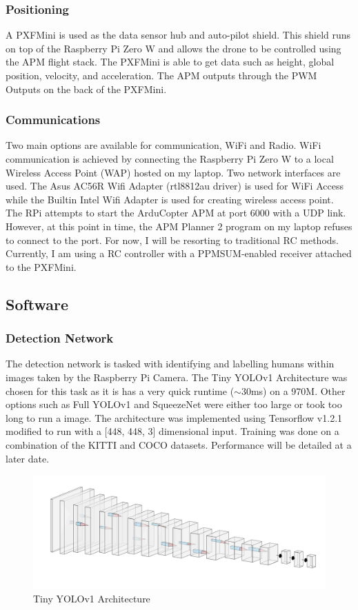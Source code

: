 \documentclass{article}
\begin{document}
\subsubsection{Positioning}
A PXFMini is used as the data sensor hub and auto-pilot shield. This shield runs on top of the Raspberry Pi Zero W and allows the drone to be controlled using the APM flight stack. The PXFMini is able to get data such as height, global position, velocity, and acceleration. The APM outputs through the PWM Outputs on the back of the PXFMini.

\subsubsection{Communications}
Two main options are available for communication, WiFi and Radio. WiFi communication is achieved by connecting the Raspberry Pi Zero W to a local Wireless Access Point (WAP) hosted on my laptop. Two network interfaces are used. The Asus AC56R Wifi Adapter (rtl8812au driver) is used for WiFi Access while the Builtin Intel Wifi Adapter is used for creating wireless access point. The RPi attempts to start the ArduCopter APM at port 6000 with a UDP link. However, at this point in time, the APM Planner 2 program on my laptop refuses to connect to the port. For now, I will be resorting to traditional RC methods. Currently, I am using a RC controller with a PPMSUM-enabled receiver attached to the PXFMini. 

\subsection{Software}
\subsubsection{Detection Network}
The detection network is tasked with identifying and labelling humans within images taken by the Raspberry Pi Camera. The Tiny YOLOv1 Architecture was chosen for this task as it is has a very quick runtime ($\sim$30ms) on a 970M. Other options such as Full YOLOv1 and SqueezeNet were either too large or took too long to run a image. The architecture was implemented using Tensorflow v1.2.1 modified to run with a [448, 448, 3] dimensional input. Training was done on a combination of the KITTI and COCO datasets. Performance will be detailed at a later date.

\begin{figure}[h!]
  \caption{Tiny YOLOv1 Architecture}
  \includegraphics[width=\textwidth]{nn}
\end{figure}
\end{document}
